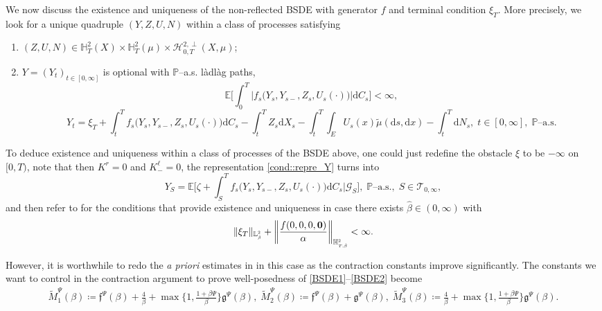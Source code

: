 \documentclass[10pt]{article} %
\newcommand\cG{\mathcal G}
\newcommand\cH{\mathcal H}
\newcommand\cT{\mathcal T}
\newcommand{\smalltext}[1]{\text{\fontsize{4}{4}\selectfont$#1$}}
\newcommand\ff{\mathfrak f}
\newcommand\fg{\mathfrak g}
\def \E{\mathbb{E}}
\def \H{\mathbb{H}}
\def \L{\mathbb{L}}
\def \P{\mathbb{P}}
\def\d{\mathrm{d}}
\begin{document}
We now discuss the existence and uniqueness of the non-reflected BSDE with generator $f$ and terminal condition $\xi_T$. More precisely, we look for a unique quadruple $(Y,Z,U,N)$ within a class of processes satisfying
\begin{enumerate}[{\bf (B1)}, leftmargin=0.9cm]
	\item\label{BSDE1} $(Z,U,N) \in \H^2_T(X) \times \H^2_T(\mu) \times \cH^{2,\perp}_{0,T}(X,\mu)$;
	\item\label{BSDE2} $Y = (Y_t)_{t \in [0,\infty]}$ is optional with $\P$--a.s. l\`adl\`ag paths,
		\begin{equation*}
			\E\bigg[\int_0^T \big|f_s\big(Y_s,Y_{s-},Z_s,U_s(\cdot)\big)\big|\d C_s\bigg] < \infty,
		\end{equation*}
		\begin{equation*}
			Y_t = \xi_T + \int_t^T f_s\big(Y_s,Y_{s-},Z_s,U_s(\cdot)\big) \d C_s - \int_t^T Z_s \d X_s - \int_t^T \int_E U_s(x)\tilde\mu(\d s, \d x) - \int_t^T \d N_s, \; t \in [0,\infty], \; \text{$\P$--a.s.}
		\end{equation*}
\end{enumerate}
To deduce existence and uniqueness within a class of processes of the BSDE above, one could just redefine the obstacle $\xi$ to be $-\infty$ on $[0,T)$, note that then $K^r = 0$ and $K^\ell_{-} = 0$, the representation \ref{cond::repre_Y} turns into
\begin{equation*}
	Y_S = \E\bigg[\zeta + \int_S^T f_s\big(Y_s,Y_{s-},Z_s,U_s(\cdot)\big)\d C_s\bigg| \cG_S\bigg], \; \text{$\P$--a.s.}, \; S \in \cT_{0,\infty},
\end{equation*}
and then refer to  for the conditions that provide existence and uniqueness in case there exists $\hat\beta \in (0,\infty)$ with
\begin{equation}\label{eq::integrability_bsde}
	\|\xi_T\|_{\L^\smalltext{2}_\smalltext{\hat\beta}} + \bigg\|\frac{f(0,0,0,\mathbf{0})}{\alpha}\bigg\|_{\H^\smalltext{2}_{\smalltext{T}\smalltext{,}\smalltext{\hat\beta}}} < \infty.
\end{equation}

However, it is worthwhile to redo the \emph{a priori} estimates in  in this case as the contraction constants improve significantly. The constants we want to control in the contraction argument to prove well-posedness of \ref{BSDE1}--\ref{BSDE2} become
\begin{align*}\label{eq::tilde_pi_psi_1} %
	\widetilde M_1^\Psi(\beta) \coloneqq \ff^\Psi(\beta) + \frac{4}{\beta} + \max\bigg\{1,\frac{1+\beta\Psi}\beta\bigg\}\fg^\Psi(\beta),\;	\widetilde M_2^\Psi(\beta) \coloneqq \ff^\Psi(\beta) + \fg^\Psi(\beta),\;
	\widetilde M_3^\Psi(\beta) \coloneqq \frac{4}{\beta} + \max\bigg\{1,\frac{1+\beta\Psi}\beta\bigg\}\fg^\Psi(\beta).
\end{align*}
\end{document}
